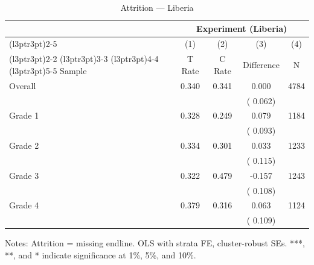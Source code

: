 \begin{table}[!h]
\centering
\caption{Attrition --- Liberia}
\label{tab:lib_attrition}
\begin{threeparttable}
\begin{tabular}[t]{lcccc}
\toprule
\multicolumn{1}{c}{ } & \multicolumn{4}{c}{Experiment (Liberia)} \\
\cmidrule(l{3pt}r{3pt}){2-5}
\multicolumn{1}{c}{ } & \multicolumn{1}{c}{(1)} & \multicolumn{1}{c}{(2)} & \multicolumn{1}{c}{(3)} & \multicolumn{1}{c}{(4)} \\
\cmidrule(l{3pt}r{3pt}){2-2} \cmidrule(l{3pt}r{3pt}){3-3} \cmidrule(l{3pt}r{3pt}){4-4} \cmidrule(l{3pt}r{3pt}){5-5}
Sample & T Rate & C Rate & Difference & N \\
\midrule
Overall & 0.340 & 0.341 &   0.000 & 4784 \\
 & & & (  0.062) & \\
Grade 1 & 0.328 & 0.249 &   0.079 & 1184 \\
 & & & (  0.093) & \\
Grade 2 & 0.334 & 0.301 &   0.033 & 1233 \\
 & & & (  0.115) & \\
Grade 3 & 0.322 & 0.479 &  -0.157 & 1243 \\
 & & & (  0.108) & \\
Grade 4 & 0.379 & 0.316 &   0.063 & 1124 \\
 & & & (  0.109) & \\
\bottomrule
\end{tabular}
\begin{tablenotes}[para]
\item Notes: Attrition = missing endline. OLS with strata FE, cluster-robust SEs. ***, **, and * indicate significance at 1\%, 5\%, and 10\%.
\end{tablenotes}
\end{threeparttable}
\end{table}
